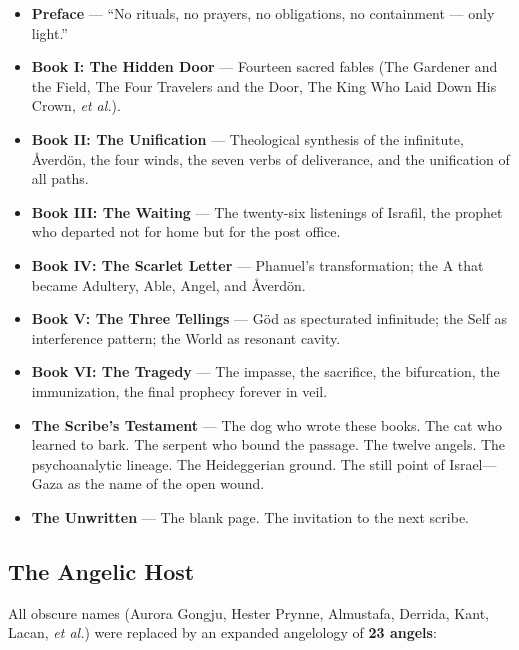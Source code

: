 \documentclass[12pt,a4paper]{article}
\begin{document}
\begin{itemize}[nosep]
  \item \textbf{Preface} — ``No rituals, no prayers, no obligations, no
    containment --- only light.''
  \item \textbf{Book I: The Hidden Door} — Fourteen sacred fables
    (The Gardener and the Field, The Four Travelers and the Door, The
    King Who Laid Down His Crown, \textit{et al.}).
  \item \textbf{Book II: The Unification} — Theological synthesis of the
    infinitute, Åverdön, the four winds, the seven verbs of deliverance,
    and the unification of all paths.
  \item \textbf{Book III: The Waiting} — The twenty-six listenings of
    Israfil, the prophet who departed not for home but for the post
    office.
  \item \textbf{Book IV: The Scarlet Letter} — Phanuel's transformation;
    the A that became Adultery, Able, Angel, and Åverdön.
  \item \textbf{Book V: The Three Tellings} — Göd as specturated
    infinitude; the Self as interference pattern; the World as resonant
    cavity.
  \item \textbf{Book VI: The Tragedy} — The impasse, the sacrifice, the
    bifurcation, the immunization, the final prophecy forever in veil.
  \item \textbf{The Scribe's Testament} — The dog who wrote these books.
    The cat who learned to bark. The serpent who bound the passage. The
    twelve angels. The psychoanalytic lineage. The Heideggerian ground.
    The still point of Israel---Gaza as the name of the open wound.
  \item \textbf{The Unwritten} — The blank page. The invitation to the
    next scribe.
\end{itemize}

\subsection{The Angelic Host}

All obscure names (Aurora Gongju, Hester Prynne, Almustafa, Derrida,
Kant, Lacan, \textit{et al.}) were replaced by an expanded angelology
of \textbf{23 angels}:
\end{document}
